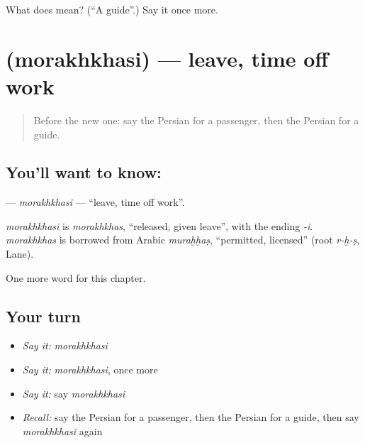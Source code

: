 \begin{tcolorbox}[breakable,colback=teal!4,colframe=teal!35!black,title={Before you move on}]
What does  mean? (\textquotedblleft{}A guide\textquotedblright{}.) Say it once more.
\end{tcolorbox}
\section[\texorpdfstring{\fa{مرخصی} (morakhkhasi)}{مرخصی (morakhkhasi)}]{ (morakhkhasi) — leave, time off work}

\label{lesson:FA-C177-morakhkhasi}



\begin{quote}
Before the new one: say the Persian for a passenger, then the Persian for a guide.
\end{quote}

\subsection*{You'll want to know: }
\textbf{} — \emph{morakhkhasi} — \textquotedblleft{}leave, time off work\textquotedblright{}.

\begin{cousinweb}
\emph{morakhkhasi} is \emph{morakhkhas}, \textquotedblleft{}released, given leave\textquotedblright{}, with the ending \emph{-i}. \emph{morakhkhas} is borrowed from Arabic \emph{muraḫḫaṣ}, \textquotedblleft{}permitted, licensed\textquotedblright{} (root \emph{r-ḫ-ṣ}, Lane).
\end{cousinweb}

\begin{grammarlens}[title={What you've built}]
One more word for this chapter.
\end{grammarlens}

\subsection*{Your turn}
\begin{itemize}
\raggedright
  \item \emph{Say it:} \emph{morakhkhasi}
  \item \emph{Say it:} \emph{morakhkhasi}, once more
  \item \emph{Say it:} say \emph{morakhkhasi}
  \item \emph{Recall:} say the Persian for a passenger, then the Persian for a guide, then say \emph{morakhkhasi} again
\end{itemize}

